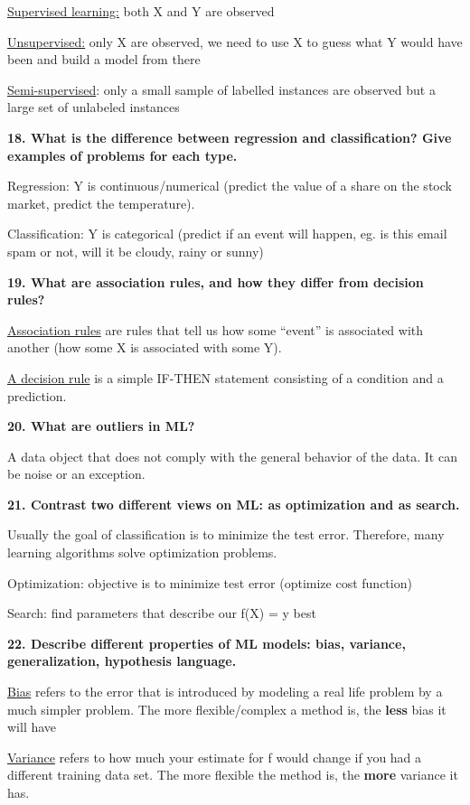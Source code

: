 \underline{Supervised learning:} both X and Y are observed

\underline{Unsupervised:} only X are observed, we need to use X to guess
what Y would have been and build a model from there

\underline{Semi-supervised}: only a small sample of labelled instances
are observed but a large set of unlabeled instances

\textbf{18. What is the difference between regression and
classification? Give examples of problems for each type.}

Regression: Y is continuous/numerical (predict the value of a share on
the stock market, predict the temperature).

Classification: Y is categorical (predict if an event will happen, eg.
is this email spam or not, will it be cloudy, rainy or sunny)

\textbf{19. What are association rules, and how they differ from
decision rules?}

\underline{Association rules} are rules that tell us how some ``event''
is associated with another (how some X is associated with some Y).

\underline{A decision rule} is a simple IF-THEN statement consisting of
a condition and a prediction.

\textbf{20. What are outliers in ML?}

A data object that does not comply with the general behavior of the
data. It can be noise or an exception.

\textbf{21. Contrast two different views on ML: as optimization and as
search.}

Usually the goal of classification is to minimize the test error.
Therefore, many learning algorithms solve optimization problems.

Optimization: objective is to minimize test error (optimize cost
function)

Search: find parameters that describe our f(X) = y best

\textbf{22. Describe different properties of ML models: bias, variance,
generalization, hypothesis language.}

\underline{Bias} refers to the error that is introduced by modeling a
real life problem by a much simpler problem. The more flexible/complex a
method is, the \textbf{less} bias it will have

\underline{Variance} refers to how much your estimate for f would change
if you had a different training data set. The more flexible the method
is, the \textbf{more} variance it has.

